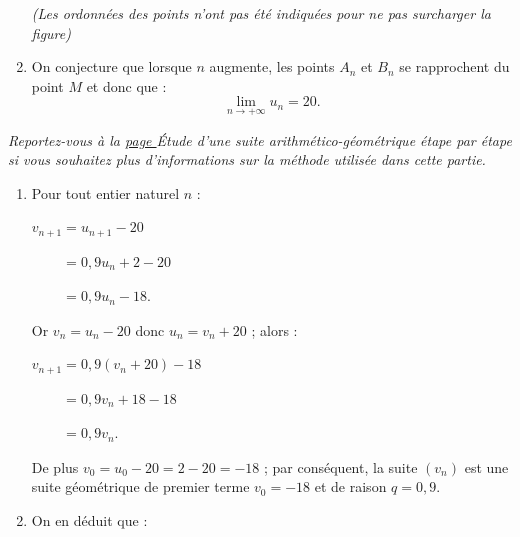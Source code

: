 \begin{corrige}
\begin{enumerate}
\begin{center}
\end{center}
          \begin{center}
               {\footnotesize \textit{(Les ordonnées des points n'ont pas été indiquées pour ne pas surcharger la figure)}}
          \end{center}
          \item
          On conjecture que lorsque $n$ augmente, les points $A_n$ et $B_n$ se rapprochent du point $M$ et donc que :
          \[ \lim_{n \rightarrow +\infty} u_n =20. \]
          \par
     \end{enumerate}
     \par
     \par
     \textit{Reportez-vous à la \hyperlink{suite-ag-pap}{page \pageref*{suite-ag-pap}}  \og \'Etude d'une suite arithmético-géométrique étape par étape  \fg{} si vous souhaitez plus d'informations sur la méthode utilisée dans cette partie.
     }
     \par
     \begin{enumerate}
          \item %
          Pour tout entier naturel $n$ :
          \par
          $v_{n+1}=u_{n+1}-20$
          \par
          $\phantom{v_{n+1}}=0,9u_n+2-20$
          \par
          $\phantom{v_{n+1}}=0,9u_n-18$.
          \par
          Or $v_n=u_n-20$ donc $u_n=v_n+20$ ; alors :
          \par
          $v_{n+1}=0,9(v_n+20)-18$
          \par
          $\phantom{v_{n+1}}=0,9v_n+18-18$
          \par
          $\phantom{v_{n+1}}=0,9v_n$.
          \par
          De plus ${v_0=u_0-20=2-20=-18}$ ; par conséquent, la suite $(v_n)$ est une suite géométrique de premier terme ${v_0=-18}$ et de raison ${q=0,9}$.
          \item %
          On en déduit que :
          \par

\end{enumerate}
\end{corrige}

